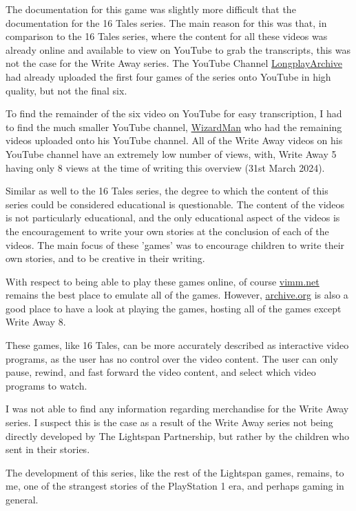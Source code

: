 The documentation for this game was slightly more difficult that the documentation for the 16 Tales series.
The main reason for this was that, in comparison to the 16 Tales series, where the content for all these videos was already online and available to view on YouTube to grab the transcripts, this was not the case for the Write Away series.
The YouTube Channel \href{https://www.youtube.com/@longplayarchive}{LongplayArchive} had already uploaded the first four games of the series onto YouTube in high quality, but not the final six.

To find the remainder of the six video on YouTube for easy transcription, I had to find the much smaller YouTube channel, \href{https://www.youtube.com/@WizardmanTonight}{WizardMan} who had the remaining videos uploaded onto his YouTube channel.
All of the Write Away videos on his YouTube channel have an extremely low number of views, with, Write Away 5 having only 8 views at the time of writing this overview (31st March 2024).

Similar as well to the 16 Tales series, the degree to which the content of this series could be considered educational is questionable.
The content of the videos is not particularly educational, and the only educational aspect of the videos is the encouragement to write your own stories at the conclusion of each of the videos.
The main focus of these 'games' was to encourage children to write their own stories, and to be creative in their writing.

With respect to being able to play these games online, of course \href{https://vimm.net}{vimm.net} remains the best place to emulate all of the games.
However, \href{https://archive.org}{archive.org} is also a good place to have a look at playing the games, hosting all of the games except Write Away 8.

These games, like 16 Tales, can be more accurately described as interactive video programs, as the user has no control over the video content.
The user can only pause, rewind, and fast forward the video content, and select which video programs to watch.

I was not able to find any information regarding merchandise for the Write Away series.
I suspect this is the case as a result of the Write Away series not being directly developed by The Lightspan Partnership, but rather by the children who sent in their stories.

The development of this series, like the rest of the Lightspan games, remains, to me, one of the strangest stories of the PlayStation 1 era, and perhaps gaming in general.